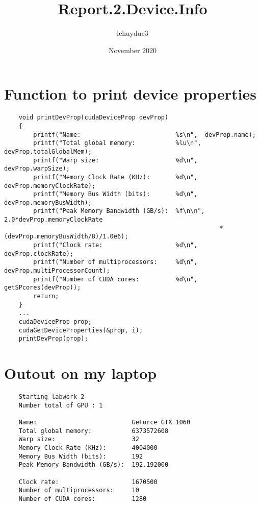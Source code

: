 \documentclass[14pt]{article}
\title{Report.2.Device.Info}
\author{lehuyduc3 }
\date{November 2020}
\begin{document}
\maketitle

\section{Function to print device properties}
\begin{lstlisting}
    void printDevProp(cudaDeviceProp devProp)
    {
        printf("Name:                          %s\n",  devProp.name);
        printf("Total global memory:           %lu\n",  devProp.totalGlobalMem);
        printf("Warp size:                     %d\n",  devProp.warpSize);
        printf("Memory Clock Rate (KHz):       %d\n", devProp.memoryClockRate);
        printf("Memory Bus Width (bits):       %d\n", devProp.memoryBusWidth);
        printf("Peak Memory Bandwidth (GB/s):  %f\n\n", 2.0*devProp.memoryClockRate
                                                           *(devProp.memoryBusWidth/8)/1.0e6);
        printf("Clock rate:                    %d\n",  devProp.clockRate);
        printf("Number of multiprocessors:     %d\n",  devProp.multiProcessorCount);
        printf("Number of CUDA cores:          %d\n", getSPcores(devProp));
        return;
    }
    ...
    cudaDeviceProp prop;
    cudaGetDeviceProperties(&prop, i);
    printDevProp(prop);
\end{lstlisting}

\section{Outout on my laptop}
\begin{verbatim}
    Starting labwork 2
    Number total of GPU : 1

    Name:                          GeForce GTX 1060
    Total global memory:           6373572608
    Warp size:                     32
    Memory Clock Rate (KHz):       4004000
    Memory Bus Width (bits):       192
    Peak Memory Bandwidth (GB/s):  192.192000
    
    Clock rate:                    1670500
    Number of multiprocessors:     10
    Number of CUDA cores:          1280
\end{verbatim}
\end{document}
